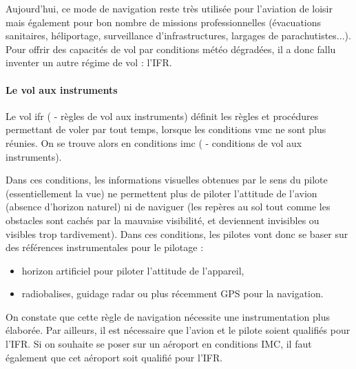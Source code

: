 		
		
		Aujourd'hui, ce mode de navigation reste très utilisée pour l'aviation de loisir mais également pour bon nombre de missions professionnelles (évacuations sanitaires, héliportage, surveillance d'infrastructures, largages de parachutistes...). \\
		
		Pour offrir des capacités de vol par conditions météo dégradées, il a donc fallu inventer un autre régime de vol : l'IFR.
		
		\paragraph{Le vol aux instruments}
		Le vol \acrshort{ifr} ( - règles de vol aux instruments) définit les règles et procédures permettant de voler par tout temps, lorsque les conditions \acrshort{vmc} ne sont plus réunies. On se trouve alors en conditions \acrshort{imc} ( - conditions de vol aux instruments).
		
		Dans ces conditions, les informations visuelles obtenues par le sens du pilote (essentiellement la vue) ne permettent plus de piloter l'attitude de l'avion (absence d'horizon naturel) ni de naviguer (les repères au sol tout comme les obstacles sont cachés par la mauvaise visibilité, et deviennent invisibles ou visibles trop tardivement). Dans ces conditions, les pilotes vont donc se baser sur des références instrumentales pour le pilotage :
		\begin{itemize}
		\item horizon artificiel pour piloter l'attitude de l'appareil,
		\item radiobalises, guidage radar ou plus récemment GPS pour la navigation.
		\end{itemize}
		
		On constate que cette règle de navigation nécessite une instrumentation plus élaborée. Par ailleurs, il est nécessaire que l'avion et le pilote soient qualifiés pour l'IFR. Si on souhaite se poser sur un aéroport en conditions IMC, il faut également que cet aéroport soit qualifié pour l'IFR.
		
		
